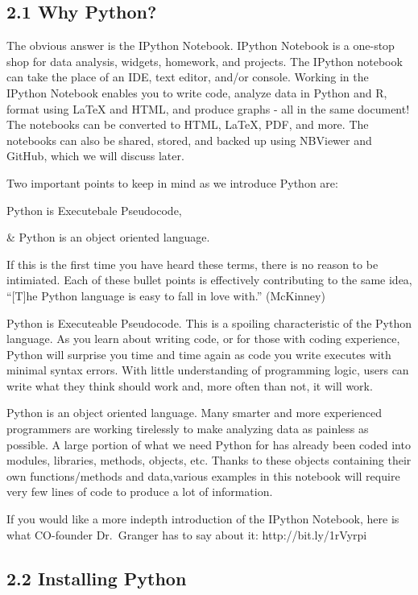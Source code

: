 \documentclass{article}
\begin{document}
    \subsection{2.1 Why Python?}


    The obvious answer is the IPython Notebook. IPython Notebook is a
one-stop shop for data analysis, widgets, homework, and projects. The
IPython notebook can take the place of an IDE, text editor, and/or
console. Working in the IPython Notebook enables you to write code,
analyze data in Python and R, format using LaTeX and HTML, and produce
graphs - all in the same document! The notebooks can be converted to
HTML, LaTeX, PDF, and more. The notebooks can also be shared, stored,
and backed up using NBViewer and GitHub, which we will discuss later.

Two important points to keep in mind as we introduce Python are:

Python is Executebale Pseudocode,

\& Python is an object oriented language.

If this is the first time you have heard these terms, there is no reason
to be intimiated. Each of these bullet points is effectively
contributing to the same idea, ``{[}T{]}he Python language is easy to
fall in love with.'' (McKinney)

Python is Executeable Pseudocode. This is a spoiling characteristic of
the Python language. As you learn about writing code, or for those with
coding experience, Python will surprise you time and time again as code
you write executes with minimal syntax errors. With little understanding
of programming logic, users can write what they think should work and,
more often than not, it will work.

Python is an object oriented language. Many smarter and more experienced
programmers are working tirelessly to make analyzing data as painless as
possible. A large portion of what we need Python for has already been
coded into modules, libraries, methods, objects, etc. Thanks to these
objects containing their own functions/methods and data,various examples
in this notebook will require very few lines of code to produce a lot of
information.

If you would like a more indepth introduction of the IPython Notebook,
here is what CO-founder Dr.~Granger has to say about it:
http://bit.ly/1rVyrpi


    \subsection{2.2 Installing Python}
\end{document}
